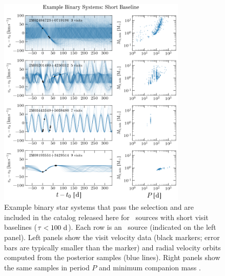 \documentclass[modern]{aastex63}
\begin{document}
\begin{figure}[!t]
    \begin{center}
    \includegraphics[width=0.8\textwidth]{example-binaries-short-placeholder.png}
    \end{center}
    \caption{%
    Example binary star systems that pass the selection and are included in the
    catalog released here for \apogee\ sources with short visit baselines
    ($\tau < 100~\mathrm{d}$).
    Each row is an \apogee\ source (indicated on the left panel).
    Left panels show the visit velocity data (black markers; error bars are
    typically smaller than the marker) and radial velocity orbits computed from
    the posterior samples (blue lines).
    Right panels show the same samples in period $P$ and minimum companion mass
    \mtwomin.
    \label{fig:binary-examples-short}
    }
\end{figure}
\end{document}
